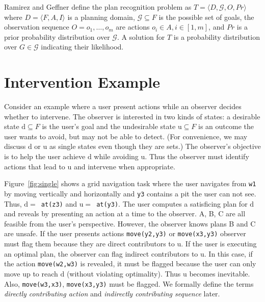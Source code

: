 \documentclass[letterpaper]{article}
\theoremstyle{plain}
\begin{document}
Ramirez and Geffner  define the plan recognition problem as $T= \langle D, \mathcal{G}, O, Pr \rangle$ where $D=\langle F, A, I \rangle$ is a planning domain, $\mathcal{G} \subseteq F$ is the possible set of goals, the observation sequence $O = o_1, \ldots , o_m$ are actions $o_i \in A, i \in[1,m]$, and $Pr$ is a prior probability distribution over $\mathcal{G}$. A solution for $T$ is a probability distribution over $G \in \mathcal{G}$ indicating their likelihood. 



\section{Intervention Example}
Consider an example where a user present actions while an observer decides whether to intervene.
The observer is interested in two kinds of states:  a desirable state $\mathrm{d} \subseteq F$ is the user's goal and the undesirable state $\mathrm{u} \subseteq F$  is an outcome the user wants to avoid, but may not be able to detect.
(For convenience, we may discuss $\mathrm{d}$ or $\mathrm{u}$ as single states even though they are sets.)
The observer's objective is to help the user achieve $\mathrm{d}$ while avoiding $\mathrm{u}$.
Thus the observer must identify actions that lead to $\mathrm{u}$ and intervene when appropriate.

Figure~\ref{fig:single} shows a grid navigation task where the user navigates from \texttt{w1} by moving vertically and horizontally and \texttt{y3} contains a pit the user can not see.
Thus, \mbox{$\mathrm{d}=$ \texttt{at(z3)}} and \mbox{$\mathrm{u}=$ \texttt{at(y3)}}. The user computes a satisficing plan for $\mathrm{d}$ and reveals by presenting an action at a time to the observer. A, B, C are all feasible from the user's perspective.
However, the observer knows plans B and C are unsafe.
If the user presents actions \texttt{move(y2,y3)} or \texttt{move(x3,y3)} observer must flag them because they are direct contributors to $\mathrm{u}$.
If the user is executing an optimal plan, the observer can flag indirect contributors to $\mathrm{u}$. In this case, if the action \texttt{move(w2,w3)} is revealed, it must be flagged because the user can only move up to reach $\mathrm{d}$ (without violating optimality). Thus $\mathrm{u}$ becomes inevitable. Also, \texttt{move(w3,x3)}, \texttt{move(x3,y3)} must be flagged. We formally define the terms \textit{directly contributing action} and \textit{indirectly contributing sequence} later.
\end{document}

